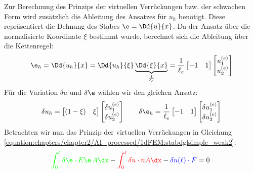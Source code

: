 \documentclass[letterpaper,10pt,german]{jupyterBook}
\begin{document}
\sphinxAtStartPar
Zur Berechnung des Prinzips der virtuellen Verrückungen bzw. der schwachen Form wird zusätzlich die Ableitung des Ansatzes für \(u_h\) benötigt. Diese repräsentiert die Dehnung des Stabes \(\e = \Dd{u}{x}\). Da der Ansatz über die normalisierte Koordinate \(\xi\) bestimmt wurde, berechnet sich die Ableitung über die Kettenregel:
\begin{equation*}
\begin{split}\e_h = \Dd{u_h}{x} = \Dd{u_h}{\xi} \underbrace{\Dd{\xi}{x}}_{\frac{1}{\ell_e}} = \frac{1}{\ell_e} \begin{bmatrix} -1 & 1 \end{bmatrix} \begin{bmatrix} u_1^{(e)} \\ u_2^{(e)}\end{bmatrix} \end{split}
\end{equation*}
\sphinxAtStartPar
Für die Variation \(\delta u\) und \(\delta \e\) wählen wir den gleichen Ansatz:
\begin{equation*}
\begin{split}\delta u_h = \begin{bmatrix}  (1-\xi) & \xi \end{bmatrix} \begin{bmatrix} \delta u_1^{(e)} \\ \delta u_2^{(e)}\end{bmatrix} \qquad \delta \e_h = \frac{1}{\ell_e} \begin{bmatrix} -1 & 1 \end{bmatrix} \begin{bmatrix} \delta u_1^{(e)} \\ \delta u_2^{(e)}\end{bmatrix} \end{split}
\end{equation*}
\sphinxAtStartPar
Betrachten wir nun das Prinzip der virtuellen Verrückungen in Gleichung \eqref{equation:chapters/chapter2/AI_processed/1dFEM:stabdglsimple_weak2}:
\begin{equation*}
\begin{split}\begin{align}
 \textcolor{green}{\int_{0}^{\ell} \delta \e \cdot E\e \, A \dx} -\textcolor{red} {\int_0^{\ell} \delta u \cdot n A \dx} - \textcolor{blue}{\delta u(\ell) \cdot F} = 0\; 
 \end{align}\end{split}
\end{equation*}
\sphinxAtStartPar
\end{document}
